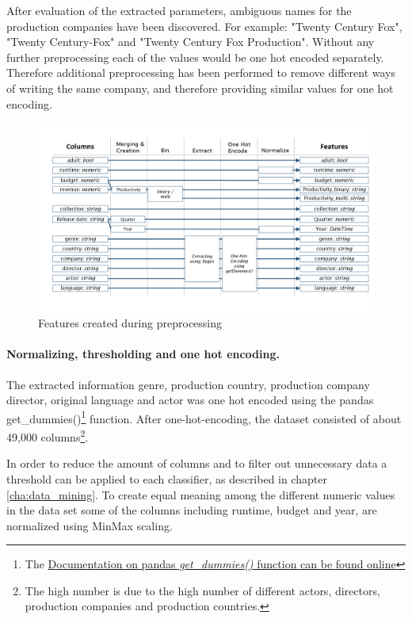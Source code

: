 After evaluation of the extracted parameters, ambiguous names for the production companies have been discovered. For example: "Twenty Century Fox", "Twenty Century-Fox" and "Twenty Century Fox Production". Without any further preprocessing each of the values would be one hot encoded separately. Therefore additional preprocessing has been performed to remove different ways of writing the same company, and therefore providing similar values for one hot encoding.
\begin{figure}
	\includegraphics[width=\textwidth]{images/3_features.png}
	\caption{Features created during preprocessing}
	\label{img:features}
\end{figure}

\paragraph{Normalizing, thresholding and one hot encoding.}
The extracted information genre, production country, production company director, original language  and actor was one hot encoded using the pandas get\_dummies()\footnote{The \hyperref{https://pandas.pydata.org/pandas-docs/stable/generated/pandas.get_dummies.html}{documentation}{pd.getDumies}{Documentation on pandas \textit{get\_dummies()} function can be found online}} function. After one-hot-encoding, the dataset consisted of about 49,000 columns\footnote{The high number is due to the high number of different actors, directors, production companies and production countries.}.


In order to reduce the amount of columns and to filter out unnecessary data a threshold can be applied to each classifier, as described in chapter \ref{cha:data_mining}. To create equal meaning among the different numeric values in the data set some of the columns including runtime, budget and year, are normalized using MinMax scaling.




